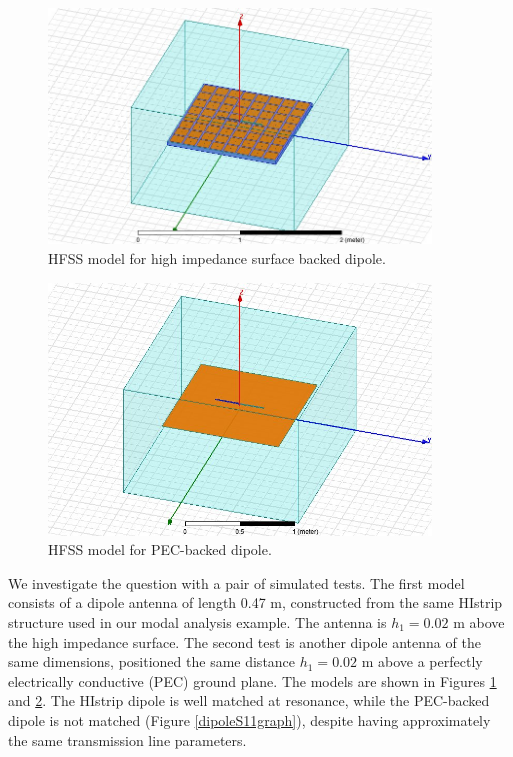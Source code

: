 \documentclass{allertonproc}
\begin{document}
\begin{figure}[htbp]
\begin{center}
\includegraphics[width=4in]{HIstripDipoleModelPic}
\caption{HFSS model for high impedance surface backed dipole.}
\label{HIstripDipoleModelPic}
\end{center}
\end{figure}
\begin{figure}[htbp]
\begin{center}
\includegraphics[width=4in]{NormalDipoleModelPic}
\caption{HFSS model for PEC-backed dipole.}
\label{NormalDipoleModelPic}
\end{center}
\end{figure}

We investigate the question with a pair of simulated tests.  The first model consists of a dipole antenna of length 0.47 m, constructed from the same HIstrip structure used in our modal analysis example.  The antenna is $h_1 = 0.02$ m above the high impedance surface.  The second test is another dipole antenna of the same dimensions, positioned the same distance $h_1 = 0.02$ m above a perfectly electrically conductive (PEC) ground plane.  The models are shown in Figures \ref{HIstripDipoleModelPic} and \ref{NormalDipoleModelPic}.  The HIstrip dipole is well matched at resonance, while the PEC-backed dipole is not matched (Figure \ref{dipoleS11graph}), despite having approximately the same transmission line parameters.
\end{document}
